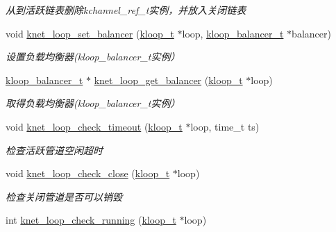 \begin{DoxyCompactItemize}
\begin{DoxyCompactList}\small\item\em 从到活跃链表删除kchannel\+\_\+ref\+\_\+t实例，并放入关闭链表 \end{DoxyCompactList}\item 
void \hyperlink{a00076_afa47d6d4673ddfd9e4884d3c9aca7f7e_afa47d6d4673ddfd9e4884d3c9aca7f7e}{knet\+\_\+loop\+\_\+set\+\_\+balancer} (\hyperlink{a00056_a97fc76209a58362019f1ded9169e397f_a97fc76209a58362019f1ded9169e397f}{kloop\+\_\+t} $\ast$loop, \hyperlink{a00056_abd3f964265beb2f8984e76f44fb5ea33_abd3f964265beb2f8984e76f44fb5ea33}{kloop\+\_\+balancer\+\_\+t} $\ast$balancer)
\begin{DoxyCompactList}\small\item\em 设置负载均衡器(kloop\+\_\+balancer\+\_\+t实例） \end{DoxyCompactList}\item 
\hyperlink{a00056_abd3f964265beb2f8984e76f44fb5ea33_abd3f964265beb2f8984e76f44fb5ea33}{kloop\+\_\+balancer\+\_\+t} $\ast$ \hyperlink{a00076_a775164485cff0fc31bc0d71204d44aca_a775164485cff0fc31bc0d71204d44aca}{knet\+\_\+loop\+\_\+get\+\_\+balancer} (\hyperlink{a00056_a97fc76209a58362019f1ded9169e397f_a97fc76209a58362019f1ded9169e397f}{kloop\+\_\+t} $\ast$loop)
\begin{DoxyCompactList}\small\item\em 取得负载均衡器(kloop\+\_\+balancer\+\_\+t实例） \end{DoxyCompactList}\item 
void \hyperlink{a00076_a00c96dec79cb9493a01cef8bb52534f4_a00c96dec79cb9493a01cef8bb52534f4}{knet\+\_\+loop\+\_\+check\+\_\+timeout} (\hyperlink{a00056_a97fc76209a58362019f1ded9169e397f_a97fc76209a58362019f1ded9169e397f}{kloop\+\_\+t} $\ast$loop, time\+\_\+t ts)
\begin{DoxyCompactList}\small\item\em 检查活跃管道空闲超时 \end{DoxyCompactList}\item 
void \hyperlink{a00076_a58a5c12ddf68c8cc9f21c373bc0bcc6f_a58a5c12ddf68c8cc9f21c373bc0bcc6f}{knet\+\_\+loop\+\_\+check\+\_\+close} (\hyperlink{a00056_a97fc76209a58362019f1ded9169e397f_a97fc76209a58362019f1ded9169e397f}{kloop\+\_\+t} $\ast$loop)
\begin{DoxyCompactList}\small\item\em 检查关闭管道是否可以销毁 \end{DoxyCompactList}\item 
int \hyperlink{a00076_af8babef4a6cb0c64d5bd25665cc36821_af8babef4a6cb0c64d5bd25665cc36821}{knet\+\_\+loop\+\_\+check\+\_\+running} (\hyperlink{a00056_a97fc76209a58362019f1ded9169e397f_a97fc76209a58362019f1ded9169e397f}{kloop\+\_\+t} $\ast$loop)

\end{DoxyCompactItemize}

